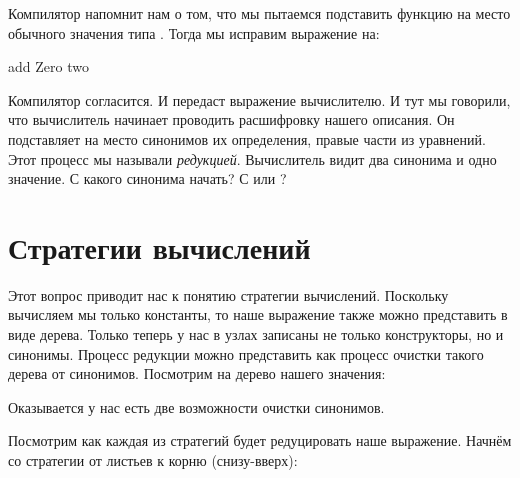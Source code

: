 Компилятор напомнит нам о том, что мы пытаемся подставить
функцию  на место обычного значения типа .
Тогда мы исправим выражение на:

\begin{code}
add Zero two
\end{code}

Компилятор согласится. И передаст выражение вычислителю. 
И тут мы говорили, что вычислитель начинает проводить
расшифровку нашего описания. Он подставляет на место 
синонимов их определения, правые части из уравнений. Этот
процесс мы называли \emph{редукцией}. 
Вычислитель видит два синонима и одно значение. С какого синонима начать? 
С  или ?

\section{Стратегии вычислений}

Этот вопрос приводит нас к понятию стратегии вычислений.
Поскольку вычисляем мы только константы, то наше выражение
также можно представить в виде дерева. Только теперь у нас 
в узлах записаны не только конструкторы, но и синонимы.
Процесс редукции можно представить как процесс очистки такого
дерева от синонимов. Посмотрим на дерево нашего значения:

Оказывается у нас есть две возможности очистки синонимов.



\smallskip

Посмотрим как каждая из стратегий будет редуцировать
наше выражение. Начнём со стратегии от листьев к корню (снизу-вверх):

